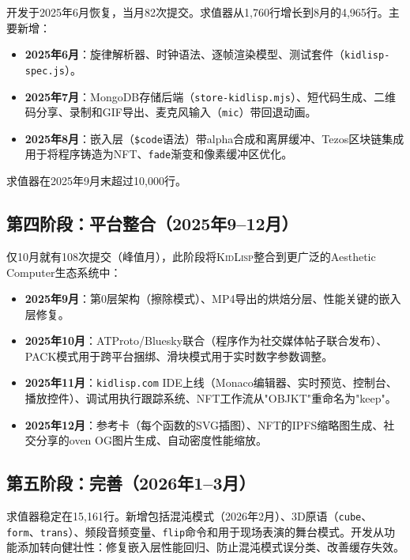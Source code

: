 \documentclass[10pt,letterpaper,twocolumn]{article}
\newcommand{\kidlisp}{\textsc{KidLisp}}
\begin{document}
开发于2025年6月恢复，当月82次提交。求值器从1,760行增长到8月的4,965行。主要新增：

\begin{itemize}
  \item \textbf{2025年6月}：旋律解析器、时钟语法、逐帧渲染模型、测试套件（\texttt{kidlisp-spec.js}）。
  \item \textbf{2025年7月}：MongoDB存储后端（\texttt{store-kidlisp.mjs}）、短代码生成、二维码分享、录制和GIF导出、麦克风输入（\texttt{mic}）带回退动画。
  \item \textbf{2025年8月}：嵌入层（\texttt{\$code}语法）带alpha合成和离屏缓冲、Tezos区块链集成用于将程序铸造为NFT、\texttt{fade}渐变和像素缓冲区优化。
\end{itemize}

求值器在2025年9月末超过10,000行。

\subsection{第四阶段：平台整合（2025年9--12月）}

仅10月就有108次提交（峰值月），此阶段将\kidlisp{}整合到更广泛的Aesthetic Computer生态系统中：

\begin{itemize}
  \item \textbf{2025年9月}：第0层架构（擦除模式）、MP4导出的烘焙分层、性能关键的嵌入层修复。
  \item \textbf{2025年10月}：ATProto/Bluesky联合（程序作为社交媒体帖子联合发布）、PACK模式用于跨平台捆绑、滑块模式用于实时数字参数调整。
  \item \textbf{2025年11月}：\texttt{kidlisp.com} IDE上线（Monaco编辑器、实时预览、控制台、播放控件）、调试用执行跟踪系统、NFT工作流从"OBJKT"重命名为"keep"。
  \item \textbf{2025年12月}：参考卡（每个函数的SVG插图）、NFT的IPFS缩略图生成、社交分享的oven OG图片生成、自动密度性能缩放。
\end{itemize}

\subsection{第五阶段：完善（2026年1--3月）}

求值器稳定在15,161行。新增包括混沌模式（2026年2月）、3D原语（\texttt{cube}、\texttt{form}、\texttt{trans}）、频段音频变量、\texttt{flip}命令和用于现场表演的舞台模式。开发从功能添加转向健壮性：修复嵌入层性能回归、防止混沌模式误分类、改善缓存失效。
\end{document}
